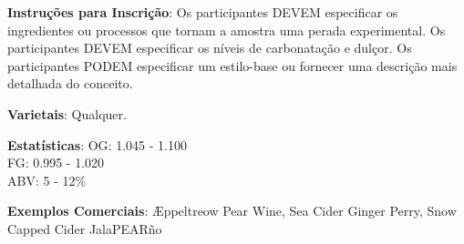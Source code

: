 \textbf{Instruções para Inscrição}: Os participantes DEVEM especificar os ingredientes ou processos que tornam a amostra uma perada experimental. Os participantes DEVEM especificar os níveis de carbonatação e dulçor. Os participantes PODEM especificar um estilo-base ou fornecer uma descrição mais detalhada do conceito.

\textbf{Varietais}: Qualquer.

\textbf{Estatísticas}: OG: 1.045 - 1.100 \\
\phantom{ } \hspace{16.5mm} FG: 0.995 - 1.020 \\
\phantom{ } \hspace{16.5mm} ABV: 5 - 12\%

\textbf{Exemplos Comerciais}: Æppeltreow Pear Wine, Sea Cider Ginger Perry, Snow Capped Cider JalaPEARño